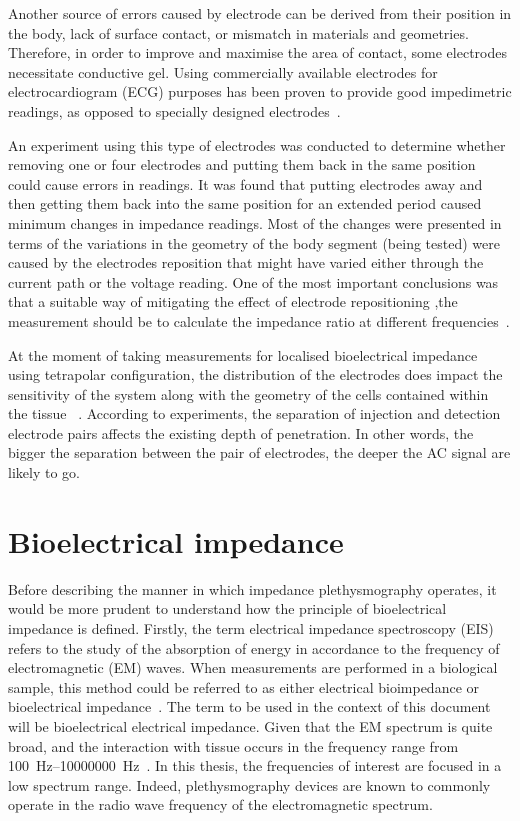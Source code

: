 Another source of errors caused by electrode can be derived from their position in the body, lack of surface contact, or mismatch in materials and geometries. Therefore, in order to improve and maximise the area of contact, some electrodes necessitate conductive gel. Using commercially available electrodes for electrocardiogram (ECG) purposes has been proven to provide good impedimetric readings, as opposed to specially designed electrodes~\cite{caicedo2012use}.

An experiment using this type of electrodes was conducted to determine whether removing one or four electrodes and putting them back in the same position could cause errors in readings. It was found that putting electrodes away and then getting them back into the same position for an extended period caused minimum changes in impedance readings. Most of the changes were presented in terms of the variations in the geometry of the body segment (being tested) were caused by the electrodes reposition that might have varied either through the current path or the voltage reading. One of the most important conclusions was that a suitable way of mitigating the effect of electrode repositioning ,the measurement should be to calculate the impedance ratio at different frequencies~\cite{lozano1997electrode}.

At the moment of taking measurements for localised bioelectrical impedance using tetrapolar configuration, the distribution of the electrodes does impact the sensitivity of the system along with the geometry of the cells contained within the tissue ~\cite{bertemes2002tissue}. According to experiments, the separation of injection and detection electrode pairs affects the existing depth of penetration. In other words, the bigger the separation between the pair of electrodes, the deeper the AC signal are likely to go.


\section{Bioelectrical impedance}
\label{section impedance BI}
Before describing the manner in which impedance plethysmography operates, it would be more prudent to understand how the principle of bioelectrical impedance is defined. Firstly, the term electrical impedance spectroscopy (EIS) refers to the study of the absorption of energy in accordance to the frequency of electromagnetic (EM) waves. When measurements are performed in a biological sample, this method could be referred to as either electrical bioimpedance or bioelectrical impedance~\cite{ivorra2003bioimpedance}. The term to be used in the context of this document will be bioelectrical electrical impedance. Given that the EM spectrum is quite broad, and the interaction with tissue occurs in the frequency range from \SIrange[scientific-notation = engineering]{100}{10000000}{\hertz}~\cite{bertemes2002tissue}. In this thesis, the frequencies of interest are focused in a low spectrum range. Indeed, plethysmography devices are known to commonly operate in the radio wave frequency of the electromagnetic spectrum.

